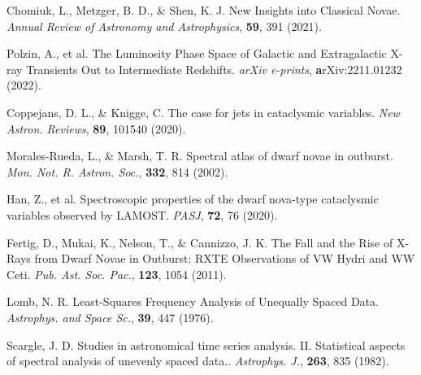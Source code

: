 \documentclass{nature_plusfigure}
\newcommand{\mn}{{Mon. Not. R. Astron. Soc.}}
\newcommand{\nar}{{New Astron. Reviews}}
\newcommand{\mnras}{\mn}
\newcommand{\apj}{{Astrophys. J.}}
\newcommand{\apss}{{Astrophys. and Space Sc.}}
\newcommand{\pasj}{{PASJ}}
\newcommand{\pasp}{{Pub. Ast. Soc. Pac.}}
\newcommand{\araa}{Annual Review of Astronomy and Astrophysics}
\begin{document}
\begin{methods}
\begin{thebibliography}{10}
 Chomiuk, L., Metzger, B. D., \& Shen, K. J. New Insights into Classical Novae. \emph{\araa}, \textbf{59}, 391 (2021). 

 Polzin, A., et al. The Luminosity Phase Space of Galactic and Extragalactic X-ray Transients Out to Intermediate Redshifts. \emph{arXiv e-prints}, \textbf arXiv:2211.01232 (2022). 

 Coppejans, D. L., \& Knigge, C. The case for jets in cataclysmic variables. \emph{\nar}, \textbf{89}, 101540 (2020). 

 Morales-Rueda, L., \& Marsh, T. R. Spectral atlas of dwarf novae in outburst. \emph{\mnras}, \textbf{332}, 814 (2002). 

 Han, Z., et al. Spectroscopic properties of the dwarf nova-type cataclysmic variables observed by LAMOST. \emph{\pasj}, \textbf{72}, 76 (2020). 

 Fertig, D., Mukai, K., Nelson, T., \& Cannizzo, J. K. The Fall and the Rise of X-Rays from Dwarf Novae in Outburst: RXTE Observations of VW Hydri and WW Ceti. \emph{\pasp}, \textbf{123}, 1054 (2011). 

 Lomb, N. R. Least-Squares Frequency Analysis of Unequally Spaced Data. \emph{\apss}, \textbf{39}, 447 (1976). 

 Scargle, J. D. Studies in astronomical time series analysis. II. Statistical aspects of spectral analysis of unevenly spaced data.. \emph{\apj}, \textbf{263}, 835 (1982). 


\end{thebibliography}

\end{methods}

\clearpage
\end{document}
